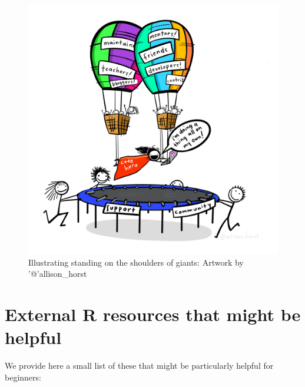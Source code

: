 \documentclass[
]{article}
\begin{document}
\begin{figure}
\centering
\includegraphics{extfiles/code_hero.jpg}
\caption{Illustrating standing on the shoulders of giants: Artwork by
'@'allison\_horst}
\end{figure}

\section{External R resources that might be
helpful}\label{external-r-resources-that-might-be-helpful}

We provide here a small list of these that might be particularly helpful
for beginners:
\end{document}
